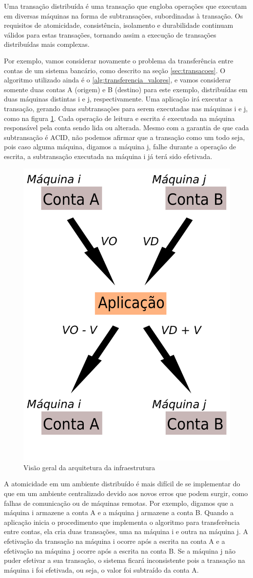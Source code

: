 \documentclass[11pt,twoside,a4paper]{book}
\begin{document}
Uma transação distribuída é uma transação que engloba operações que executam em diversas máquinas na forma de subtransações, subordinadas à transação. Os requisitos de atomicidade, consistência, isolamento e durabilidade continuam válidos para estas transações, tornando assim a execução de transações distribuídas mais complexas.

Por exemplo, vamos considerar novamente o problema da transferência entre contas de um sistema bancário, como descrito na seção \ref{sec:transacoes}. O algoritmo utilizado ainda é o \ref{alg:transferencia_valores}, e vamos considerar somente duas contas A (origem) e B (destino) para este exemplo, distribuídas em duas máquinas distintas i e j, respectivamente. Uma aplicação irá executar a transação, gerando duas subtransações para serem executadas nas máquinas i e j, como na figura \ref{fig:transacao_distribuida}. Cada operação de leitura e escrita é executada na máquina responsável pela conta sendo lida ou alterada. Mesmo com a garantia de que cada subtransação é ACID, não podemos afirmar que a transação como um todo seja, pois caso alguma máquina, digamos a máquina j, falhe durante a operação de escrita, a subtransação executada na máquina i já terá sido efetivada.

\begin{figure}
  \centering
  \includegraphics[width=.40\textwidth]{transacao_distribuida} 
  \caption{Visão geral da arquitetura da infraestrutura}
  \label{fig:transacao_distribuida} 
\end{figure}

A atomicidade em um ambiente distribuído é mais difícil de se implementar do que em um ambiente centralizado devido aos novos erros que podem surgir, como falhas de comunicação ou de máquinas remotas. Por exemplo, digamos que a máquina i armazene a conta A e a máquina j armazene a conta B. Quando a aplicação inicia o procedimento que implementa o algoritmo para transferência entre contas, ela cria duas transações, uma na máquina i e outra na máquina j. A efetivação da transação na máquina i ocorre após a escrita na conta A e a efetivação na máquina j ocorre após a escrita na conta B. Se a máquina j não puder efetivar a sua transação, o sistema ficará inconsistente pois a transação na máquina i foi efetivada, ou seja, o valor foi subtraído da conta A.
\end{document}

